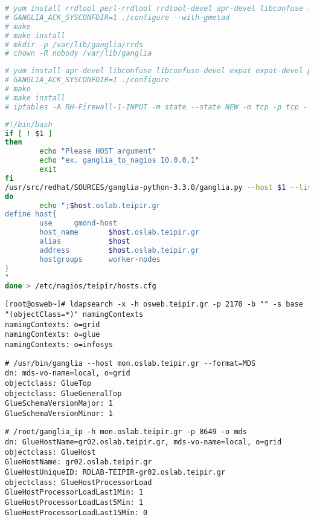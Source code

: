 \begin{lstlisting}[language=bash,caption=Gmetad installation,label=gmetad_installation]
# yum install rrdtool perl-rrdtool rrdtool-devel apr-devel libconfuse libconfuse-devel expat expat-devel pcre pcre-devel
# GANGLIA_ACK_SYSCONFDIR=1 ./configure --with-gmetad
# make
# make install
# mkdir -p /var/lib/ganglia/rrds
# chown -R nobody /var/lib/ganglia
\end{lstlisting}

\begin{lstlisting}[language=bash,caption=Gmond installation,label=gmond_installation]
# yum install apr-devel libconfuse libconfuse-devel expat expat-devel pcre pcre-devel
# GANGLIA_ACK_SYSCONFDIR=1 ./configure
# make
# make install
# iptables -A RH-Firewall-1-INPUT -m state --state NEW -m tcp -p tcp --dport 8649 -j ACCEPT
\end{lstlisting}

\begin{lstlisting}[language=bash,caption=Ganglia to Nagios script,label=nagios_script]
#!/bin/bash
if [ ! $1 ]
then
        echo "Please HOST argument"
        echo "ex. ganglia_to_nagios 10.0.0.1"
        exit
fi
/usr/src/redhat/SOURCES/ganglia-python-3.3.0/ganglia.py --host $1 --live | while read host
do
        echo ";$host.oslab.teipir.gr
define host{
        use     gmond-host
        host_name       $host.oslab.teipir.gr
        alias           $host
        address         $host.oslab.teipir.gr
        hostgroups      worker-nodes
}
"
done > /etc/nagios/teipir/hosts.cfg
\end{lstlisting}

\begin{lstlisting}[label=tops,caption=Getting the top elements]
[root@osweb~]# ldapsearch -x -h osweb.teipir.gr -p 2170 -b "" -s base "(objectClass=*)" namingContexts
namingContexts: o=grid
namingContexts: o=glue
namingContexts: o=infosys
\end{lstlisting}

\begin{lstlisting}[label=python_gip,caption=Ganglia official Python client result]
# /usr/bin/ganglia --host mon.oslab.teipir.gr --format=MDS
dn: mds-vo-name=local, o=grid
objectclass: GlueTop
objectclass: GlueGeneralTop
GlueSchemaVersionMajor: 1
GlueSchemaVersionMinor: 1
\end{lstlisting}

\begin{lstlisting}[label=perl_gip,caption=Perl Ganglia Information Provider]
# /root/ganglia_ip -h mon.oslab.teipir.gr -p 8649 -o mds
dn: GlueHostName=gr02.oslab.teipir.gr, mds-vo-name=local, o=grid
objectclass: GlueHost
GlueHostName: gr02.oslab.teipir.gr
GlueHostUniqueID: RDLAB-TEIPIR-gr02.oslab.teipir.gr
objectclass: GlueHostProcessorLoad
GlueHostProcessorLoadLast1Min: 1
GlueHostProcessorLoadLast5Min: 1
GlueHostProcessorLoadLast15Min: 0
\end{lstlisting}

